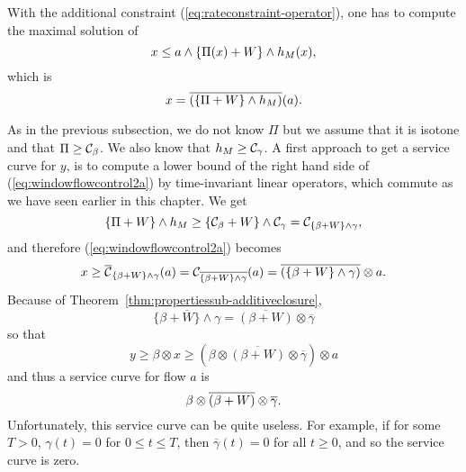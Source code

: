 With the additional constraint (\ref{eq:rateconstraint-operator}), one has to compute the maximal solution of
\begin{equation}
\mylabel{eq:windowflowcontrol2}
x \leq a \wedge \left\{ \Pi(x) + W \right\}  \wedge h_{M}(x),
\end{equation}
which is
\begin{equation}
\mylabel{eq:windowflowcontrol2a}
x = \overline{ \left( \left\{ \Pi + W \right\}  \wedge h_{M} \right) } (a).
\end{equation}



As in the previous subsection, we do not know $\Pi$ but we assume that it is isotone and that $\Pi \geq \mathcal C_{\beta}$. We also know that $h_{M} \geq \mathcal C_{\gamma}$. A first approach to get a service curve for $y$, is to compute a lower bound of the right hand side of (\ref{eq:windowflowcontrol2a}) by time-invariant linear operators, which commute as we have seen earlier in this chapter. We get
$$  \{ \Pi + W \} \wedge h_{M} \geq  \{ \mathcal C_{\beta} + W \} \wedge \mathcal C_{\gamma}  = \mathcal C_{ \{\beta + W \} \wedge \gamma}, $$
and therefore (\ref{eq:windowflowcontrol2a}) becomes
$$ x \geq \overline{\mathcal C}_{\{\beta + W \} \wedge \gamma}(a) = \mathcal C_{\overline{\{\beta + W \} \wedge \gamma}}(a) = \overline{(\{\beta + W \} \wedge \gamma)} \otimes a. $$
Because of Theorem~\ref{thm:propertiessub-additiveclosure},
$$ \overline{ \{ \beta + W \} \wedge \gamma } = \overline {( \beta + W )} \otimes \overline{\gamma} $$
so that
$$ y \geq \beta \otimes x \geq \left( \beta \otimes \overline { (\beta + W) } \otimes \overline{\gamma} \right) \otimes a $$
and thus a service curve for flow $a$ is
\begin{equation}
\mylabel{eq:firstservicecurve}
 \beta \otimes \overline { (\beta + W) } \otimes \overline{\gamma} .
\end{equation}
Unfortunately, this service curve can be quite useless. For example, if for some $T > 0$, $\gamma (t) = 0$ for $0 \leq t \leq T$,
then $\overline{\gamma}(t) = 0$ for all $t \geq 0$, and so the service curve is zero.

